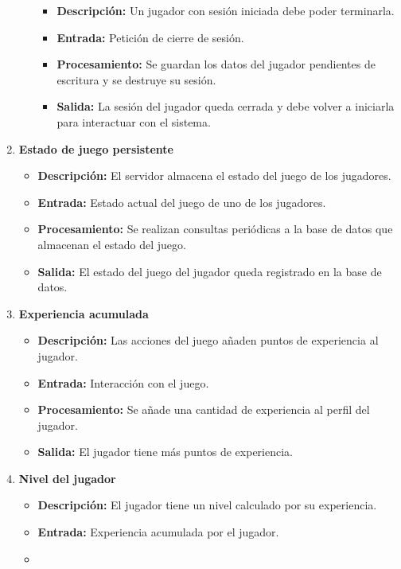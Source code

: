 \begin{enumerate}[label=\textbf{RF-\arabic*}]
\begin{enumerate}[label=\textbf{RF-1.\arabic*}]
\begin{itemize}
					\item
						\textbf{Descripción:}
						Un jugador con sesión iniciada debe poder terminarla.
					\item
						\textbf{Entrada:}
						Petición de cierre de sesión.
					\item
						\textbf{Procesamiento:}
						Se guardan los datos del jugador pendientes de escritura y se destruye su sesión.
					\item
						\textbf{Salida:}
						La sesión del jugador queda cerrada y debe volver a iniciarla para interactuar con el sistema.
				\end{itemize}
		\end{enumerate}
	\item
		\textbf{Estado de juego persistente}
		\begin{itemize}
			\item
				\textbf{Descripción:}
				El servidor almacena el estado del juego de los jugadores.
			\item
				\textbf{Entrada:}
				Estado actual del juego de uno de los jugadores.
			\item
				\textbf{Procesamiento:}
				Se realizan consultas periódicas a la base de datos que almacenan el estado del juego.
			\item
				\textbf{Salida:}
				El estado del juego del jugador queda registrado en la base de datos.
		\end{itemize}
	\item
		\textbf{Experiencia acumulada}
		\begin{itemize}
			\item
				\textbf{Descripción:}
				Las acciones del juego añaden puntos de experiencia al jugador.
			\item
				\textbf{Entrada:}
				Interacción con el juego.
			\item
				\textbf{Procesamiento:}
				Se añade una cantidad de experiencia al perfil del jugador.
			\item
				\textbf{Salida:}
				El jugador tiene más puntos de experiencia.
		\end{itemize}
	\item
		\textbf{Nivel del jugador}
		\begin{itemize}
			\item
				\textbf{Descripción:}
				El jugador tiene un nivel calculado por su experiencia.
			\item
				\textbf{Entrada:}
				Experiencia acumulada por el jugador.
			\item

\end{itemize}
\end{enumerate}
